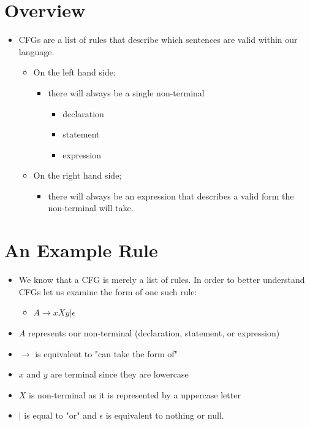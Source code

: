 \documentclass{article}
\begin{document}
\section{Overview}
\begin{itemize}
    \item CFGs are a list of rules that describe which sentences are valid within our language. 
    \begin{itemize}
        \item On the left hand side;
        \begin{itemize}
            \item there will always be a single non-terminal
            \begin{itemize}
                \item declaration
                \item statement
                \item expression
            \end{itemize}
        \end{itemize}
        \item On the right hand side;
        \begin{itemize}
            \item there will always be an expression that describes a valid form the non-terminal will take.
        \end{itemize}
    \end{itemize}
\end{itemize}

\section{An Example Rule}
\begin{itemize}
    \item We know that a CFG is merely a list of rules. In order to better understand CFGs let us examine the form of one such
        rule:
    \begin{itemize}
        \item $A\rightarrow xXy|\epsilon$
    \end{itemize}
    \item $A$ represents our non-terminal (declaration, statement, or expression)
    \item $\rightarrow$ is equivalent to "can take the form of"
    \item $x$ and $y$ are terminal since they are lowercase
    \item $X$ is non-terminal as it is represented by a uppercase letter
    \item $|$ is equal to "or" and $\epsilon$ is equivalent to nothing or null.
\end{itemize}
\end{document}

